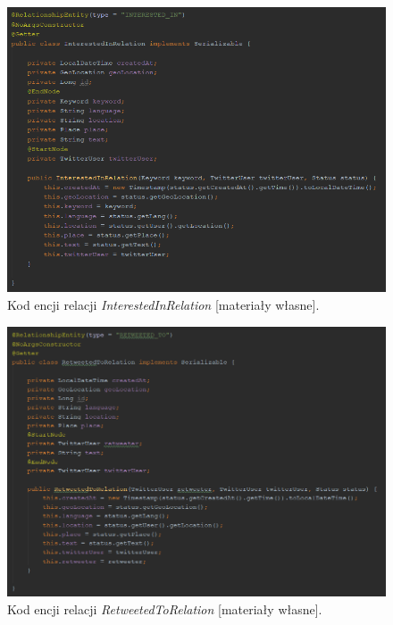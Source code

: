 \begin{figure}[h] %
	\centering
	\includegraphics[width=1.0\linewidth]{img/twitter_analyser_interested_in_relation}
	\caption{Kod encji relacji \textit{InterestedInRelation} [materiały własne].}
\end{figure}

\begin{figure}[h] %
	\centering
	\includegraphics[width=1.0\linewidth]{img/twitter_analyser_retweeted_to_relation}
	\caption{Kod encji relacji \textit{RetweetedToRelation} [materiały własne].}
\end{figure}

